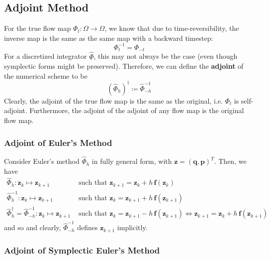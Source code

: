 \documentclass{article}
\begin{document}
  \subsection{Adjoint Method}

    For the true flow map $\Phi_t: \Omega \longrightarrow \Omega$, we know that due to time-reversibility, the inverse map is the same as the same map with a backward timestep: 
    \[\Phi_t^{-1} = \Phi_{-t}\]
    For a discretized integrator $\hat{\Phi}$, this may not always be the case (even though symplectic forms might be preserved). Therefore, we can define the \textbf{adjoint} of the numerical scheme to be 
    \[(\hat{\Phi}_{h})^\dagger \coloneqq \hat{\Phi}_{-h}^{-1}\]
    Clearly, the adjoint of the true flow map is the same as the original, i.e. $\Phi_t$ is self-adjoint. Furthermore, the adjoint of the adjoint of any flow map is the original flow map. 

    \subsubsection{Adjoint of Euler's Method}

      Consider Euler's method $\hat{\Phi}_{h}$ in fully general form, with $\mathbf{z} = (\mathbf{q}, \mathbf{p})^T$. Then, we have 
      \begin{align*}
          \hat{\Phi}_{h}: \mathbf{z}_k \mapsto \mathbf{z}_{k+1} & \text{ such that } \mathbf{z}_{k + 1} = \mathbf{z}_k + h \,\mathbf{f}( \mathbf{z}_k) \\
          \hat{\Phi}_{h}^{-1}: \mathbf{z}_k \mapsto \mathbf{z}_{k+1} & \text{ such that } \mathbf{z}_{k} = \mathbf{z}_{k+1} + h \,\mathbf{f}( \mathbf{z}_{k+1}) \\
          \hat{\Phi}_h^\dagger = \hat{\Phi}_{-h}^{-1}: \mathbf{z}_k \mapsto \mathbf{z}_{k+1} & \text{ such that } \mathbf{z}_{k} = \mathbf{z}_{k+1} - h \,\mathbf{f}( \mathbf{z}_{k+1}) \iff \mathbf{z}_{k+1} = \mathbf{z}_k + h\, \mathbf{f}(\mathbf{z}_{k+1}) 
      \end{align*}
      and so 
      and clearly, $\hat{\Phi}_{-h}^{-1}$ defines $\mathbf{z}_{k+1}$ implicitly. 

    \subsubsection{Adjoint of Symplectic Euler's Method}
\end{document}
